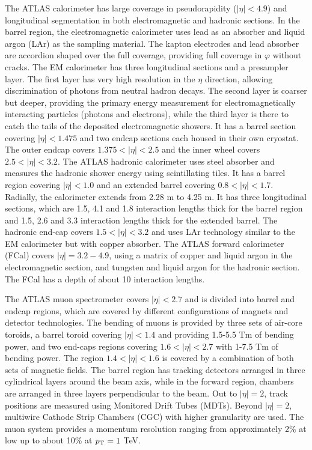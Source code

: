 %
The ATLAS calorimeter has large coverage in pseudorapidity ($|\eta|<4.9$)
and longitudinal segmentation in both electromagnetic and hadronic
sections.
In the barrel region, the electromagnetic calorimeter uses lead as an absorber
and liquid argon (LAr) as the sampling material.
The kapton electrodes and lead absorber are accordion shaped over the full
coverage, providing full coverage in $\varphi$ without cracks.
The EM calorimeter has three longitudinal sections and a presampler layer.
The first layer has very high resolution
in the $\eta$ direction, allowing discrimination of photons from
neutral hadron decays.
The second layer is coarser but deeper, providing the primary energy
measurement for electromagnetically interacting particles (photons and
electrons), while the third layer is there to catch the tails of the
deposited electromagnetic showers.
It has a barrel section covering $|\eta|<1.475$ and two endcap sections
each housed in their own cryostat.  The outer endcap covers $1.375<|\eta|<2.5$
and the inner wheel covers $2.5<|\eta|<3.2$.
%
The ATLAS hadronic calorimeter uses steel absorber and measures the
hadronic shower energy using scintillating tiles.
It has a barrel region covering $|\eta|<1.0$ and an extended barrel
covering $0.8 < |\eta|< 1.7$.
Radially, the calorimeter extends from 2.28 m to 4.25 m.  It
has three longitudinal sections, which are 1.5, 4.1 and 1.8 interaction
lengths thick for the barrel region and 1.5, 2.6 and 3.3 interaction
lengths thick for the extended barrel.
%
The hadronic end-cap covers $1.5 < |\eta|< 3.2$ and uses LAr technology
similar to the EM calorimeter but with copper absorber.
%
The ATLAS forward calorimeter (FCal) covers $|\eta|=3.2-4.9$, using
a matrix of copper and liquid argon in the electromagnetic section,
and tungsten and liquid argon for the hadronic section.
The FCal has a depth of about 10 interaction lengths.
%

The ATLAS muon spectrometer covers $|\eta|<2.7$ and is divided into
barrel and endcap regions, which are covered by different configurations
of magnets and detector technologies.
The bending of muons is provided by three sets of air-core toroids,
a barrel toroid covering $|\eta|<1.4$ and providing 1.5-5.5 Tm of bending power,
and two end-caps regions covering $1.6 < |\eta| < 2.7$ with 1-7.5 Tm of
bending power.  The region $1.4 < |\eta| <1.6$ is covered by
a combination of both sets of magnetic fields.
The barrel region has tracking detectors arranged in three cylindrical
layers around the beam axis, while in the forward region, chambers are
arranged in three layers perpendicular to the beam.
Out to $|\eta|=2$, track positions are measured using Monitored Drift Tubes (MDTs).
Beyond $|\eta|=2$, multiwire Cathode Strip Chambers (CGC) with higher granularity
are used.
The muon system provides a momentum resolution ranging from approximately 2\% at
low \pT up to about 10\% at $\mbox{$p_{\mathrm{T}}$}=1$ TeV.
%

